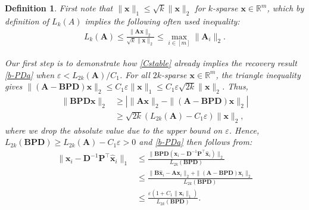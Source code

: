 \documentclass[9pt,twocolumn]{pnas-new}
\newtheorem{definition}{Definition}
\begin{document}
\begin{definition}
First note that $\|\mathbf{x}\|_1 \leq \sqrt{k} \|\mathbf{x}\|_2$ for $k$-sparse $\mathbf{x} \in \mathbb{R}^m$, which by definition of $L_k(A)$ implies the following often used inequality:
\begin{align}\label{delrho}
L_k(\mathbf{A}) \leq \frac{\|\mathbf{A}\mathbf{x}\|_2}{\sqrt{k} \|\mathbf{x}\|_2} %
\leq  \max_{i \in [m]}\|\mathbf{A}_i\|_2.
\end{align}

Our first step is to demonstrate how \eqref{Cstable} already implies the recovery result \eqref{b-PDa} when $\varepsilon < L_{2k}(\mathbf{A}) / C_1$. For all $2k$-sparse $\mathbf{x} \in \mathbb{R}^m$, the triangle inequality gives \mbox{$\|(\mathbf{A}-\mathbf{BPD})\mathbf{x}\|_2  \leq C_1\varepsilon \|\mathbf{x}\|_1 \leq C_1 \varepsilon \sqrt{2k}  \|\mathbf{x}\|_2$}. Thus, 
\begin{align*}
\|\mathbf{BPD}\mathbf{x}\|_2 
&\geq | \|\mathbf{A}\mathbf{x}\|_2 - \|(\mathbf{A}-\mathbf{BPD})\mathbf{x}\|_2 | \\
&\geq \sqrt{2k} (L_{2k}(\mathbf{A}) -  C_1\varepsilon) \|\mathbf{x}\|_2,
\end{align*}
%
where we drop the absolute value due to the upper bound on $\varepsilon$. Hence, $L_{2k}(\mathbf{BPD}) \geq L_{2k}(\mathbf{A}) - C_1\varepsilon  > 0$ and \eqref{b-PDa} then follows from:
\begin{align*}
\|\mathbf{x}_i - \mathbf{D}^{-1}\mathbf{P}^{\top}\mathbf{\hat x}_i \|_1
&\leq \frac{\|\mathbf{BPD}(\mathbf{x}_i - \mathbf{D}^{-1}\mathbf{P}^{\top}\mathbf{\hat x}_i)\|_2}{L_{2k}(\mathbf{BPD})} \\
&\leq \frac{\|\mathbf{B}\mathbf{\hat x}_i - \mathbf{A}\mathbf{x}_i\|_2 + \|(\mathbf{A} - \mathbf{BPD})\mathbf{x}_i\|_2}{L_{2k}(\mathbf{BPD})} \\
&\leq \frac{\varepsilon (1+C_1 \|\mathbf{x}_i\|_1)}{L_{2k}(\mathbf{BPD})}.
\end{align*}


\end{definition}
\end{document}
